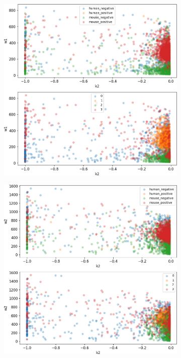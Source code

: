 \begin{figure}
\begin{subfigure}{0.49\textwidth}
	\end{subfigure}
	\hfill
	\begin{subfigure}{0.49\textwidth}
		\includegraphics[width=\textwidth]{fig/seperate_k2_w1}
	\end{subfigure}
	\hfill
	\begin{subfigure}{0.49\textwidth}
		\includegraphics[width=\textwidth]{fig/seperate_k2_w2}

\end{subfigure}
\end{figure}
